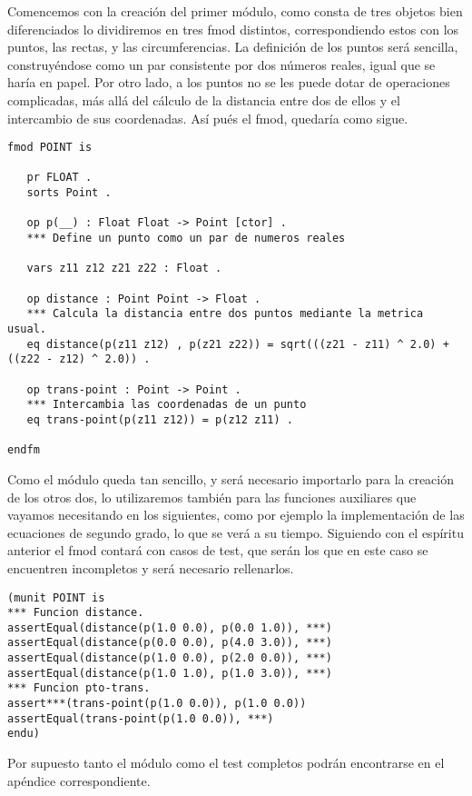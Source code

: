 Comencemos con la creación del primer módulo, como consta de tres objetos bien diferenciados lo dividiremos en tres fmod distintos, correspondiendo estos con los puntos, las rectas, y las circumferencias. La definición de los puntos será sencilla, construyéndose como un par consistente por dos números reales, igual que se haría en papel. Por otro lado, a los puntos no se les puede dotar de operaciones complicadas, más allá del cálculo de la distancia entre dos de ellos y el intercambio de sus coordenadas. Así pués el fmod, quedaría como sigue.
{\codesize
\begin{verbatim}
fmod POINT is

   pr FLOAT .
   sorts Point .

   op p(__) : Float Float -> Point [ctor] .
   *** Define un punto como un par de numeros reales

   vars z11 z12 z21 z22 : Float .

   op distance : Point Point -> Float .
   *** Calcula la distancia entre dos puntos mediante la metrica usual.
   eq distance(p(z11 z12) , p(z21 z22)) = sqrt(((z21 - z11) ^ 2.0) + ((z22 - z12) ^ 2.0)) .

   op trans-point : Point -> Point .
   *** Intercambia las coordenadas de un punto
   eq trans-point(p(z11 z12)) = p(z12 z11) .

endfm
\end{verbatim}
}
Como el módulo queda tan sencillo, y será necesario importarlo para la creación de los otros dos, lo utilizaremos también para las funciones auxiliares que vayamos necesitando en los siguientes, como por ejemplo la implementación de las ecuaciones de segundo grado, lo que se verá a su tiempo. Siguiendo con el espíritu anterior el fmod contará con casos de test, que serán los que en este caso se encuentren incompletos y será necesario rellenarlos. \par

{\codesize
\begin{verbatim}
(munit POINT is
*** Funcion distance.
assertEqual(distance(p(1.0 0.0), p(0.0 1.0)), ***)
assertEqual(distance(p(0.0 0.0), p(4.0 3.0)), ***)
assertEqual(distance(p(1.0 0.0), p(2.0 0.0)), ***)
assertEqual(distance(p(1.0 1.0), p(1.0 3.0)), ***)
*** Funcion pto-trans.
assert***(trans-point(p(1.0 0.0)), p(1.0 0.0))
assertEqual(trans-point(p(1.0 0.0)), ***)
endu)
\end{verbatim}
}

Por supuesto tanto el módulo como el test completos podrán encontrarse en el apéndice correspondiente.\par

